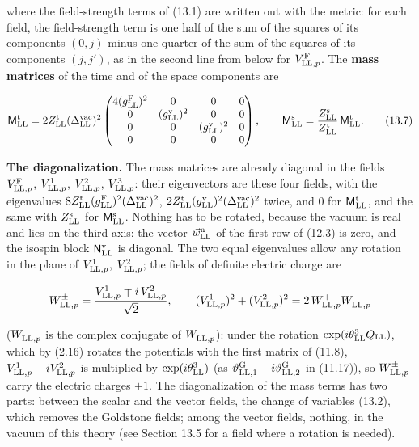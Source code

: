 \documentclass[
  10pt,
]{article}
\begin{document}
where the field-strength terms of (13.1) are written out with the
metric: for each field, the field-strength term is one half of the sum
of the squares of its components \((0,j)\) minus one quarter of the sum
of the squares of its components \((j,j')\), as in the second line from
below for \(V^{\rm F}_{{\rm LL},p}\). The \textbf{mass matrices} of the
time and of the space components are

\[\mathsf M^{\rm t}_{\rm LL}=2Z^{\rm t}_{\rm LL}(\Delta^{\rm vac}_{\rm LL})^2\begin{pmatrix}4(g^{\rm F}_{\rm LL})^2&0&0&0\\0&(g^{\rm v}_{\rm LL})^2&0&0\\0&0&(g^{\rm v}_{\rm LL})^2&0\\0&0&0&0\end{pmatrix},\qquad\mathsf M^{\rm s}_{\rm LL}=\frac{Z^{\rm s}_{\rm LL}}{Z^{\rm t}_{\rm LL}}\,\mathsf M^{\rm t}_{\rm LL}.\tag{13.7}\]

\textbf{The diagonalization.} The mass matrices are already diagonal in
the fields \(V^{\rm F}_{{\rm LL},p}\), \(V^1_{{\rm LL},p}\),
\(V^2_{{\rm LL},p}\), \(V^3_{{\rm LL},p}\): their eigenvectors are these
four fields, with the eigenvalues
\(8Z^{\rm t}_{\rm LL}(g^{\rm F}_{\rm LL})^2(\Delta^{\rm vac}_{\rm LL})^2\),
\(2Z^{\rm t}_{\rm LL}(g^{\rm v}_{\rm LL})^2(\Delta^{\rm vac}_{\rm LL})^2\)
twice, and 0 for \(\mathsf M^{\rm t}_{\rm LL}\), and the same with
\(Z^{\rm s}_{\rm LL}\) for \(\mathsf M^{\rm s}_{\rm LL}\). Nothing has
to be rotated, because the vacuum is real and lies on the third axis:
the vector \(\vec w^{\rm n}_{\rm LL}\) of the first row of (12.3) is
zero, and the isospin block \(\mathsf N^{\rm v}_{\rm LL}\) is diagonal.
The two equal eigenvalues allow any rotation in the plane of
\(V^1_{{\rm LL},p}\), \(V^2_{{\rm LL},p}\); the fields of definite
electric charge are

\[W^\pm_{{\rm LL},p}=\frac{V^1_{{\rm LL},p}\mp i\,V^2_{{\rm LL},p}}{\sqrt2},\qquad(V^1_{{\rm LL},p})^2+(V^2_{{\rm LL},p})^2=2\,W^+_{{\rm LL},p}W^-_{{\rm LL},p}\]

(\(W^-_{{\rm LL},p}\) is the complex conjugate of \(W^+_{{\rm LL},p}\)):
under the rotation \(\exp(i\theta^3_{\rm LL}Q_{\rm LL})\), which by
(2.16) rotates the potentials with the first matrix of (11.8),
\(V^1_{{\rm LL},p}-iV^2_{{\rm LL},p}\) is multiplied by
\(\exp(i\theta^3_{\rm LL})\) (as
\(\vartheta^{\rm G}_{{\rm LL},1}-i\vartheta^{\rm G}_{{\rm LL},2}\) in
(11.17)), so \(W^\pm_{{\rm LL},p}\) carry the electric charges \(\pm1\).
The diagonalization of the mass terms has two parts: between the scalar
and the vector fields, the change of variables (13.2), which removes the
Goldstone fields; among the vector fields, nothing, in the vacuum of
this theory (see Section 13.5 for a field where a rotation is needed).
\end{document}
